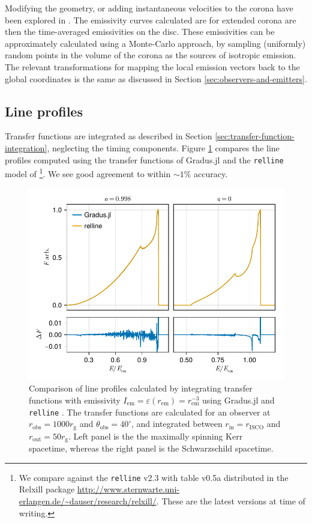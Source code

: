 \documentclass[fleqn,usenatbib]{mnras}
\newcommand{\Gradus}{Gradus.jl }
\newcommand{\relline}{\texttt{relline} }
\newcommand{\rg}{r_\text{g}}
\newcommand{\risco}{r_\text{ISCO}}
\begin{document}
Modifying the geometry, or adding instantaneous velocities to the corona have
been explored in \cite{gonzalez_probing_2017}. The emissivity curves calculated
are for extended corona are then the time-averaged emissivities on the disc.
These emissivities can be approximately calculated using a Monte-Carlo approach,
by sampling (uniformly) random points in the volume of the corona as the sources
of isotropic emission. The relevant transformations for mapping the local
emission vectors back to the global coordinates is the same as discussed in
Section \ref{sec:observers-and-emitters}.

\subsection{Line profiles}

Transfer functions are integrated as described in Section
\ref{sec:transfer-function-integration}, neglecting the timing components.
Figure \ref{fig:relline-comparison} compares the line profiles computed using
the transfer functions of \Gradus and the \relline model of
\cite{dauser_broad_2010}\footnote{We compare against the \relline v2.3 with
table v0.5a distributed in the Relxill package
\url{http://www.sternwarte.uni-erlangen.de/~dauser/research/relxill/}. These are
the latest versions at time of writing.}. We see good agreement to within $\sim
1\%$ accuracy.

\begin{figure}
	\centering
	\includegraphics[width=0.99\linewidth]{figures/lineprofiles.comparison.pdf}
	\caption{Comparison of line profiles calculated by integrating transfer functions with emissivity $I_\text{em} = \varepsilon(r_\text{em}) = r_\text{em}^{-3}$ using \Gradus and \relline. The transfer functions are calculated for an observer at $r_\text{obs} = 1000\rg$ and $\theta_\text{obs} = 40^\circ$, and integrated between $r_\text{in} = \risco$ and $r_\text{out} = 50 \rg$. Left panel is the the maximally spinning Kerr spacetime, whereas the right panel is the Schwarzschild spacetime.}
	\label{fig:relline-comparison}
\end{figure}
\end{document}
